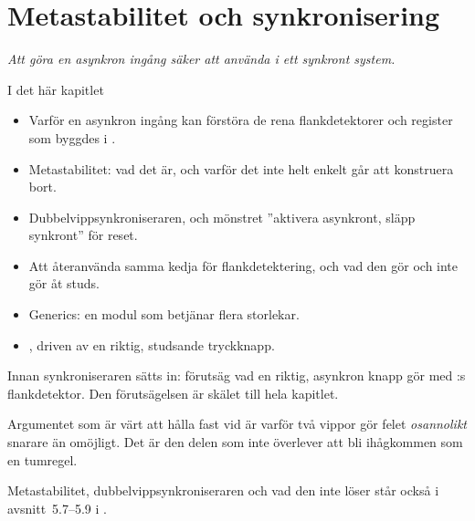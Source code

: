
\chapter{Metastabilitet och synkronisering}
\label{c4:ch}

{\large\itshape Att göra en asynkron ingång säker att använda i ett synkront system.\par}

\begin{chapterbox}{I det här kapitlet}
\begin{itemize}
  \item Varför en asynkron ingång kan förstöra de rena flankdetektorer och register som byggdes i
    .
  \item Metastabilitet: vad det är, och varför det inte helt enkelt går att konstruera bort.
  \item Dubbelvippsynkroniseraren, och mönstret ”aktivera asynkront, släpp synkront” för reset.
  \item Att återanvända samma kedja för flankdetektering, och vad den gör och inte gör åt studs.
  \item Generics: en modul som betjänar flera storlekar.
  \item {}, driven av en riktig, studsande tryckknapp.
\end{itemize}
\end{chapterbox}

Innan synkroniseraren sätts in: förutsäg vad en riktig, asynkron knapp gör med :s
flankdetektor. Den förutsägelsen är skälet till hela kapitlet.

Argumentet som är värt att hålla fast vid är varför två vippor gör felet \emph{osannolikt} snarare
än omöjligt. Det är den delen som inte överlever att bli ihågkommen som en tumregel.

\note[Repetition] Metastabilitet, dubbelvippsynkroniseraren och vad den inte löser står också i
avsnitt~5.7--5.9 i \debook{}.





